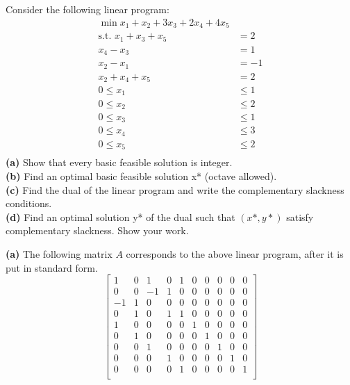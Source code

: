 \documentclass[fleqn]{homework}
\begin{document}
  \begin{problem}{5}
    \begin{question}
      Consider the following linear program:
      \begin{align*}
        \min x_1 + x_2 + 3x_3 + 2x_4 + 4x_5 & \\
        \text{s.t. } x_1 + x_3 + x_5 &= 2 \\
        x_4 - x_3 &= 1 \\
        x_2 - x_1 &= -1 \\
        x_2 + x_4 + x_5 &= 2 \\
        0 \le x_1 &\le 1 \\
        0 \le x_2 &\le 2 \\
        0 \le x_3 &\le 1 \\
        0 \le x_4 &\le 3 \\
        0 \le x_5 &\le 2 \\
      \end{align*}
      \textbf{(a)} Show that every basic feasible solution is integer.\\
      \textbf{(b)} Find an optimal basic feasible solution x* (octave allowed).\\
      \textbf{(c)} Find the dual of the linear program and write the
      complementary slackness conditions.\\
      \textbf{(d)} Find an optimal solution y* of the dual such that $(x*, y*)$
      satisfy complementary slackness. Show your work.\\
    \end{question}

    \textbf{(a)} The following matrix $A$ corresponds to the above linear
    program, after it is put in standard form.
    \begin{equation*}
      \begin{bmatrix*}
        1 & 0 & 1 & 0 & 1 & 0 & 0 & 0 & 0 & 0 \\
        0 & 0 & -1 & 1 & 0 & 0 & 0 & 0 & 0 & 0 \\
        -1 & 1 & 0 & 0 & 0 & 0 & 0 & 0 & 0 & 0 \\
        0 & 1 & 0 & 1 & 1 & 0 & 0 & 0 & 0 & 0 \\
        1 & 0 & 0 & 0 & 0 & 1 & 0 & 0 & 0 & 0 \\
        0 & 1 & 0 & 0 & 0 & 0 & 1 & 0 & 0 & 0 \\
        0 & 0 & 1 & 0 & 0 & 0 & 0 & 1 & 0 & 0 \\
        0 & 0 & 0 & 1 & 0 & 0 & 0 & 0 & 1 & 0 \\
        0 & 0 & 0 & 0 & 1 & 0 & 0 & 0 & 0 & 1 \\
      \end{bmatrix*}
    \end{equation*}


\end{problem}
\end{document}
